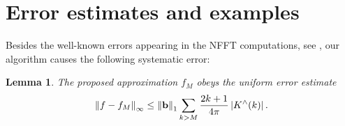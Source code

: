 \documentclass[11pt,a4paper,twoside,bibtotoc]{scrartcl}
\theoremstyle{plain}
\newtheorem{lemma}[theorem]{Lemma}
\theoremstyle{definition}
\theoremstyle{remark}
\newcommand{\fun}[2]{\ensuremath{#1{\hspace{-0.4ex}}\left(#2\right)}}
\numberwithin{equation}{section}
\numberwithin{table}{section}
\numberwithin{figure}{section}
\begin{document}
\section{Error estimates and examples}\label{Basics:SphericalKernels}
Besides the well-known errors appearing in the NFFT computations, see
\cite{postta01}, our algorithm causes the following systematic error:
\begin{lemma}\label{lemma:error}
  The proposed approximation $f_{M}$ obeys the uniform error estimate
  \begin{equation*}
    \left\|f - f_{M}\right\|_{\infty} \le \left\|\mathbf{b}\right\|_1 \sum_{k>M}
    \frac{2k+1}{4\pi} \left|\fun{K^{\wedge}}{k}\right|.
  \end{equation*}
\end{lemma}
\end{document}
